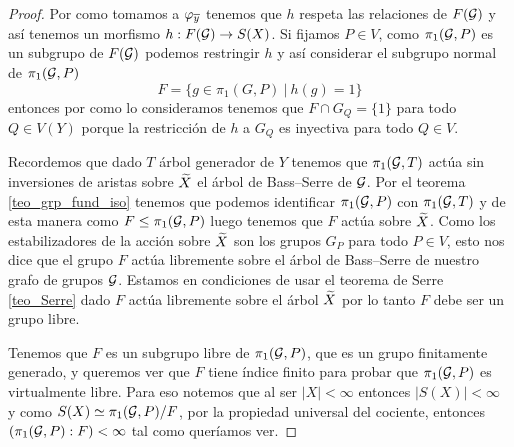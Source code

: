 \documentclass[tesis.tex]{subfiles}
\begin{document}
\begin{proof}
	Por como tomamos a $\varphi_{\overline y}$ tenemos que $h$ respeta las relaciones de $F({\cal G})$ y así tenemos un morfismo $h:F({\cal G}) \to S(X)$.
	Si fijamos $P \in V$, como $\pi_1({\cal G},P)$ es un subgrupo de $F({\cal G})$ podemos restringir $h$ y así considerar el subgrupo normal de $\pi_1({\cal G}, P)$ 
	\[
	F = \{  g \in \pi_1(G,P) \ | \ h(g) = 1  \}
	\]
	entonces por como lo consideramos tenemos que $F \cap G_Q = \{ 1 \}$ para todo $Q \in V(Y)$ porque la restricción de $h$ a $G_Q$ es inyectiva para todo $Q \in V$.
	
	Recordemos que dado $T$ árbol generador de $Y$ tenemos que $\pi_1({\cal G}, T)$ actúa sin inversiones de aristas sobre $\widetilde X$ el árbol de Bass--Serre de ${\cal G}$.
	Por el teorema \ref{teo_grp_fund_iso} tenemos que podemos identificar $\pi_1({\cal G},P)$ con $\pi_1({\cal G},T)$ y de esta manera como $F \le \pi_1({\cal G},P)$ luego tenemos que $F$ actúa sobre $\widetilde X$.
	Como los estabilizadores de la acción sobre $\widetilde X$ son los grupos $G_{P}$ para todo $P \in V$,	esto nos dice que el grupo $F$ actúa libremente sobre el árbol de Bass--Serre de nuestro grafo de grupos ${\cal G}$.
	Estamos en condiciones de usar el teorema de Serre \ref{teo_Serre} dado $F$ actúa libremente sobre el árbol $\widetilde X$ por lo tanto $F$ debe ser un grupo libre. 
	
	Tenemos que $F$ es un subgrupo libre de $\pi_1({\cal G}, P)$, que es un grupo finitamente generado, y queremos ver que $F$ tiene índice finito para probar que $\pi_1({\cal G},P)$ es virtualmente libre.
	Para eso notemos que al ser $|X| < \infty$ entonces $|S(X)| < \infty$ y como $S(X) \simeq \pi_1({\cal G}, P) / F$, por la propiedad universal del cociente, entonces $(\pi_1({\cal G}, P) : F) < \infty$ tal como queríamos ver.
	
\end{proof}
\end{document}
